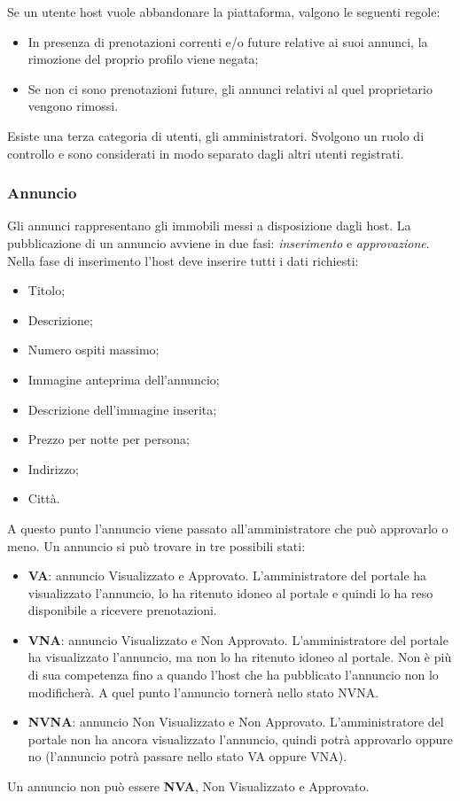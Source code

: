 \documentclass[1_relazione.tex]{subfiles}
\begin{document}
Se un utente host vuole abbandonare la piattaforma, valgono le seguenti regole:
\begin{itemize}
\item In presenza di prenotazioni correnti e/o future relative ai suoi annunci, la rimozione del proprio profilo viene negata;
\item Se non ci sono prenotazioni future, gli annunci relativi al quel proprietario vengono rimossi.
\end{itemize}
Esiste una terza categoria di utenti, gli amministratori. Svolgono un ruolo di controllo e sono considerati in modo separato dagli altri utenti registrati.  \\
\subsubsection{Annuncio} 
Gli annunci rappresentano gli immobili messi a disposizione dagli host. La pubblicazione di un annuncio avviene in due fasi: \textit{inserimento} e \textit{approvazione}.
Nella fase di inserimento l'host deve inserire tutti i dati richiesti:
\begin{itemize}
 \item Titolo;
 \item Descrizione;
 \item Numero ospiti massimo;
 \item Immagine anteprima dell'annuncio;
 \item Descrizione dell'immagine inserita;
 \item Prezzo per notte per persona;
 \item Indirizzo;
 \item Città.
\end{itemize}
A questo punto l'annuncio viene passato all'amministratore che può approvarlo o meno. Un annuncio si può trovare in tre possibili stati:

\begin{itemize}
\item \textbf{VA}: annuncio Visualizzato e Approvato. L'amministratore del portale ha visualizzato l'annuncio, lo ha ritenuto idoneo al portale e quindi lo ha reso disponibile a ricevere prenotazioni.
\item \textbf{VNA}: annuncio Visualizzato e Non Approvato. L'amministratore del portale ha visualizzato l'annuncio, ma non lo ha ritenuto idoneo al portale. Non è più di sua competenza fino a quando l'host che ha pubblicato l'annuncio non lo modificherà. A quel punto l'annuncio tornerà nello stato NVNA.
\item \textbf{NVNA}: annuncio Non Visualizzato e Non Approvato. L'amministratore del portale non ha ancora visualizzato l'annuncio, quindi potrà approvarlo oppure no (l'annuncio potrà passare nello stato VA oppure VNA).
\end{itemize}
Un annuncio non pu\`{o} essere \textbf{NVA},  Non Visualizzato e Approvato.
\end{document}
